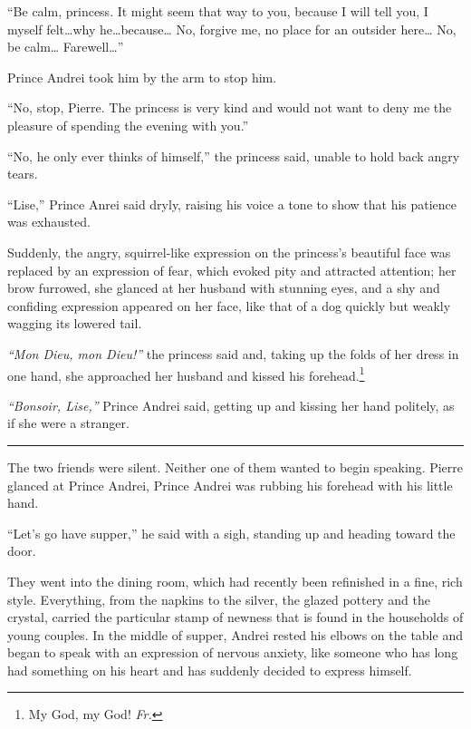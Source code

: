 ``Be calm, princess. It might seem that way to you, because I will tell you, I myself felt\ldots{}why he\ldots{}because\ldots{} No, forgive me, no place for an outsider here\ldots{} No, be calm\ldots{} Farewell\ldots{}'' %

Prince Andrei took him by the arm to stop him.

``No, stop, Pierre. The princess is very kind and would not want to deny me the pleasure of spending the evening with you.'' %

``No, he only ever thinks of himself,'' the princess said, unable to hold back angry tears. %

``Lise,'' Prince Anrei said dryly, raising his voice a tone to show that his patience was exhausted. %

Suddenly, the angry, squirrel-like expression on the princess's beautiful face was replaced by an expression of fear, which evoked pity and attracted attention; her brow furrowed, she glanced at her husband with stunning eyes, and a shy and confiding expression appeared on her face, like that of a dog quickly but weakly wagging its lowered tail.

\textit{``Mon Dieu, mon Dieu!''} the princess said and, taking up the folds of her dress in one hand, she approached her husband and kissed his forehead.\footnote{My God, my God! \textit{Fr.}}

\textit{``Bonsoir, Lise,''} Prince Andrei said, getting up and kissing her hand politely, as if she were a stranger. %

\begin{center}
	\rule{5em}{0.4pt}
\end{center}

The two friends were silent. Neither one of them wanted to begin speaking. Pierre glanced at Prince Andrei, Prince Andrei was rubbing his forehead with his little hand.

``Let's go have supper,'' he said with a sigh, standing up and heading toward the door.

They went into the dining room, which had recently been refinished in a fine, rich style. Everything, from the napkins to the silver, the glazed pottery and the crystal, carried the particular stamp of newness that is found in the households of young couples. In the middle of supper, Andrei rested his elbows on the table and began to speak with an expression of nervous anxiety, like someone who has long had something on his heart and has suddenly decided to express himself.

